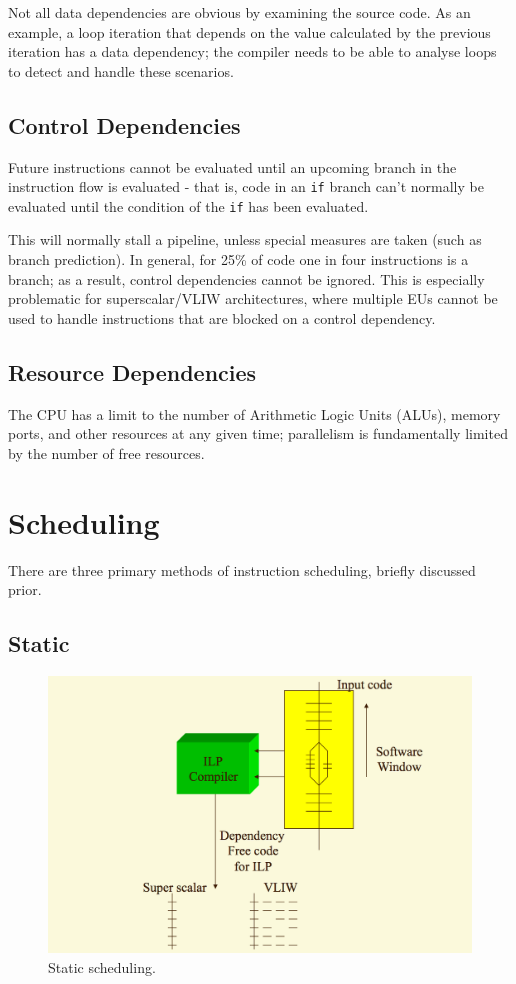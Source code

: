Not all data dependencies are obvious by examining the source code. As an example, a loop iteration that depends on the value calculated by the previous iteration has a data dependency; the compiler needs to be able to analyse loops to detect and handle these scenarios.

\subsection{Control Dependencies}
Future instructions cannot be evaluated until an upcoming branch in the instruction flow is evaluated - that is, code in an \texttt{if} branch can't normally be evaluated until the condition of the \texttt{if} has been evaluated.

This will normally stall a pipeline, unless special measures are taken (such as branch prediction). In general, for 25\% of code one in four instructions is a branch; as a result, control dependencies cannot be ignored. This is especially problematic for superscalar/VLIW architectures, where multiple EUs cannot be used to handle instructions that are blocked on a control dependency.

\subsection{Resource Dependencies}
The CPU has a limit to the number of Arithmetic Logic Units (ALUs), memory ports, and other resources at any given time; parallelism is fundamentally limited by the number of free resources.

\section{Scheduling}
There are three primary methods of instruction scheduling, briefly discussed prior.

\subsection{Static}
\begin{figure}
\centering
\includegraphics[width=0.7\linewidth]{figures/screenshot069}
\caption{Static scheduling.}
\label{fig:screenshot069}
\end{figure}

